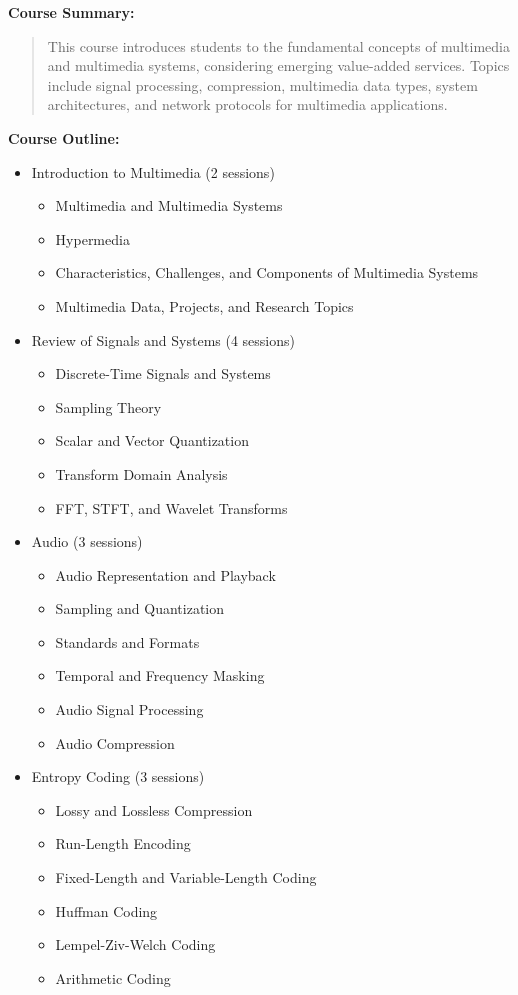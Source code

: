 \documentclass[12pt]{article}
\begin{document}
\textbf{Course Summary:} 
\begin{quote}
   This course introduces students to the fundamental concepts of multimedia and multimedia systems, considering emerging value-added services. Topics include signal processing, compression, multimedia data types, system architectures, and network protocols for multimedia applications.
\end{quote}

\textbf{Course Outline:}
\begin{itemize}
    \item Introduction to Multimedia (2 sessions)
    \begin{itemize}
        \item Multimedia and Multimedia Systems
        \item Hypermedia
        \item Characteristics, Challenges, and Components of Multimedia Systems
        \item Multimedia Data, Projects, and Research Topics
    \end{itemize}
    
    \item Review of Signals and Systems (4 sessions)
    \begin{itemize}
        \item Discrete-Time Signals and Systems
        \item Sampling Theory
        \item Scalar and Vector Quantization
        \item Transform Domain Analysis
        \item FFT, STFT, and Wavelet Transforms
    \end{itemize}
    
    \item Audio (3 sessions)
    \begin{itemize}
        \item Audio Representation and Playback
        \item Sampling and Quantization
        \item Standards and Formats
        \item Temporal and Frequency Masking
        \item Audio Signal Processing
        \item Audio Compression
    \end{itemize}
    
    \item Entropy Coding (3 sessions)
    \begin{itemize}
        \item Lossy and Lossless Compression
        \item Run-Length Encoding
        \item Fixed-Length and Variable-Length Coding
        \item Huffman Coding
        \item Lempel-Ziv-Welch Coding
        \item Arithmetic Coding
    \end{itemize}
    

\end{itemize}
\end{document}
